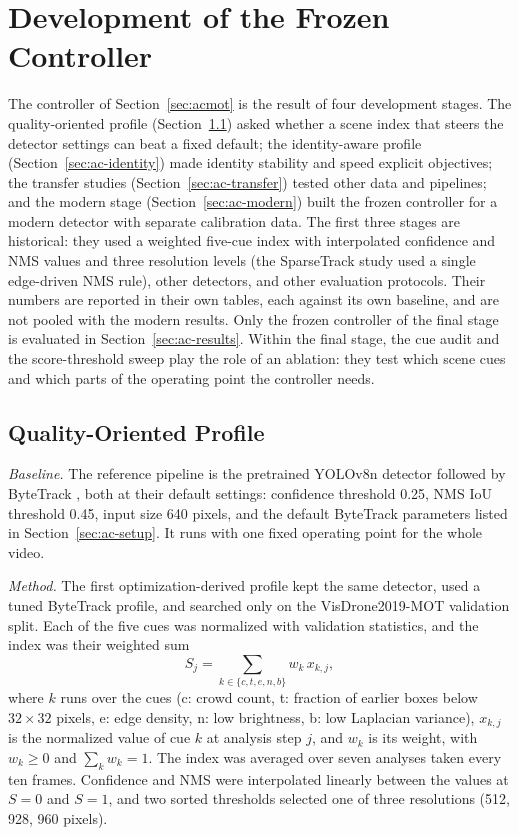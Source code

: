 \section{Development of the Frozen Controller}\label{sec:ac-dev}
The controller of Section~\ref{sec:acmot} is the result of four development stages. The quality-oriented profile (Section~\ref{sec:ac-quality}) asked whether a scene index that steers the detector settings can beat a fixed default; the identity-aware profile (Section~\ref{sec:ac-identity}) made identity stability and speed explicit objectives; the transfer studies (Section~\ref{sec:ac-transfer}) tested other data and pipelines; and the modern stage (Section~\ref{sec:ac-modern}) built the frozen controller for a modern detector with separate calibration data. The first three stages are historical: they used a weighted five-cue index with interpolated confidence and NMS values and three resolution levels (the SparseTrack study used a single edge-driven NMS rule), other detectors, and other evaluation protocols. Their numbers are reported in their own tables, each against its own baseline, and are not pooled with the modern results. Only the frozen controller of the final stage is evaluated in Section~\ref{sec:ac-results}. Within the final stage, the cue audit and the score-threshold sweep play the role of an ablation: they test which scene cues and which parts of the operating point the controller needs.

\subsection{Quality-Oriented Profile}\label{sec:ac-quality}
\emph{Baseline.} The reference pipeline is the pretrained YOLOv8n detector \cite{jocher2023yolov8} followed by ByteTrack \cite{zhang2022bytetrack}, both at their default settings: confidence threshold 0.25, NMS IoU threshold 0.45, input size 640 pixels, and the default ByteTrack parameters listed in Section~\ref{sec:ac-setup}. It runs with one fixed operating point for the whole video.

\emph{Method.} The first optimization-derived profile kept the same detector, used a tuned ByteTrack profile, and searched only on the VisDrone2019-MOT validation split. Each of the five cues was normalized with validation statistics, and the index was their weighted sum
\begin{equation}
S_j=\sum_{k\in\{c,t,e,n,b\}}w_k\,x_{k,j},
\label{eq:ac-histsci}
\end{equation}
where $k$ runs over the cues (c: crowd count, t: fraction of earlier boxes below $32\times32$ pixels, e: edge density, n: low brightness, b: low Laplacian variance), $x_{k,j}$ is the normalized value of cue $k$ at analysis step $j$, and $w_k$ is its weight, with $w_k\geq0$ and $\sum_k w_k=1$. The index was averaged over seven analyses taken every ten frames. Confidence and NMS were interpolated linearly between the values at $S=0$ and $S=1$, and two sorted thresholds selected one of three resolutions (512, 928, 960 pixels).

